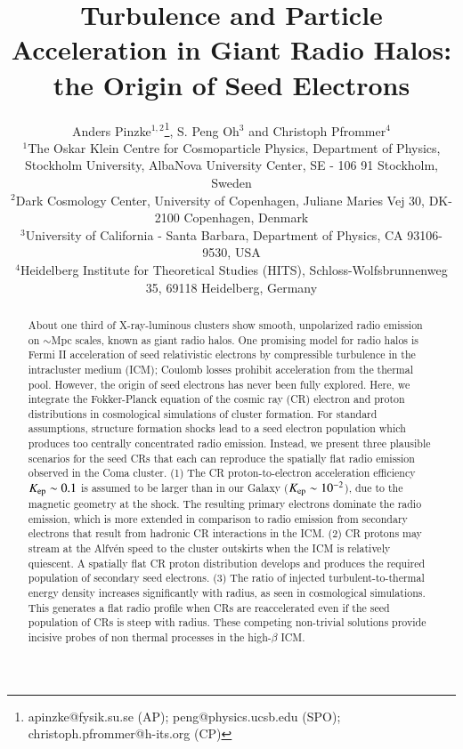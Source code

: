 \documentclass[a4paper,fleqn,usenatbib]{mnras}
\title[Origin of Seed Electrons]{Turbulence and Particle Acceleration in Giant Radio Halos: the Origin of Seed Electrons}
\author[A. Pinzke, S. Peng Oh and C. Pfrommer] 
{Anders Pinzke$^{1,2}$\thanks{apinzke@fysik.su.se (AP); peng@physics.ucsb.edu (SPO); christoph.pfrommer@h-its.org (CP)}, S. Peng Oh$^{3}$ and Christoph Pfrommer$^{4}$\footnotemark[1]\\
$^{1}$The Oskar Klein Centre for Cosmoparticle Physics, Department
  of Physics, Stockholm University, AlbaNova University Center, SE - 106 91
  Stockholm, Sweden\\
$^{2}$Dark Cosmology Center, University of Copenhagen,
  Juliane Maries Vej 30, DK-2100 Copenhagen, Denmark\\
  $^{3}$University of California - Santa Barbara,
  Department of Physics, CA 93106-9530, USA\\
$^{4}$Heidelberg Institute for Theoretical Studies
  (HITS), Schloss-Wolfsbrunnenweg 35, 69118 Heidelberg, Germany}
\begin{document}
\pagerange{\pageref{firstpage}--\pageref{lastpage}} 
\maketitle
\label{firstpage}



 
\begin{abstract}
  About one third of X-ray-luminous clusters show smooth, unpolarized
  radio emission on $\sim$Mpc scales, known as giant radio halos. One
  promising model for radio halos is Fermi II acceleration of seed
  relativistic electrons by compressible turbulence in the
  intracluster medium (ICM); Coulomb losses prohibit acceleration from
  the thermal pool. However, the origin of seed electrons has never
  been fully explored. Here, we integrate the Fokker-Planck equation
  of the cosmic ray (CR) electron and proton distributions in
  cosmological simulations of cluster formation. For standard
  assumptions, structure formation shocks lead to a seed electron
  population which produces too centrally concentrated radio
  emission. Instead, we present three plausible scenarios for the seed
  CRs that each can reproduce the spatially flat radio emission
  observed in the Coma cluster. (1) The CR proton-to-electron
  acceleration efficiency $K_{\mathrm{ep}} \sim 0.1$ is assumed to be
  larger than in our Galaxy ($K_{\mathrm{ep}} \sim 10^{-2}$), due to the
  magnetic geometry at the shock. The resulting primary electrons
  dominate the radio emission, which is more extended in comparison to
  radio emission from secondary electrons that result from hadronic CR
  interactions in the ICM. (2) CR protons may stream at the Alfv{\'e}n
  speed to the cluster outskirts when the ICM is relatively
  quiescent. A spatially flat CR proton distribution develops and
  produces the required population of secondary seed electrons. (3)
  The ratio of injected turbulent-to-thermal energy density increases
  significantly with radius, as seen in cosmological simulations. This
  generates a flat radio profile when CRs are reaccelerated even if
  the seed population of CRs is steep with radius. These competing
  non-trivial solutions provide incisive probes of non thermal
  processes in the high-$\beta$ ICM.
\end{abstract} 

\end{document}
